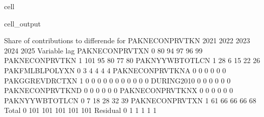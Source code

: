 \documentclass[letterpaper,10pt,english]{jupyterBook}
\begin{document}
\begin{sphinxuseclass}{cell}
\begin{sphinxVerbatimOutput}
\begin{sphinxuseclass}{cell_output}
\begin{sphinxVerbatim}[commandchars=\\\{\}]
 Share of contributions to differende for  PAKNECONPRVTKN
                            2021        2022        2023        2024        2025
Variable         lag                                                            
PAKNECONPRVTXN    0          80\PYGZpc{}         94\PYGZpc{}         97\PYGZpc{}         96\PYGZpc{}         99\PYGZpc{}
PAKNECONPRVTKN   \PYGZhy{}1         101\PYGZpc{}         95\PYGZpc{}         80\PYGZpc{}         77\PYGZpc{}         80\PYGZpc{}
PAKNYYWBTOTLCN   \PYGZhy{}1         \PYGZhy{}28\PYGZpc{}         \PYGZhy{}6\PYGZpc{}         15\PYGZpc{}         22\PYGZpc{}         26\PYGZpc{}
PAKFMLBLPOLYXN    0           3\PYGZpc{}          4\PYGZpc{}          4\PYGZpc{}          4\PYGZpc{}          4\PYGZpc{}
PAKNECONPRVTKN\PYGZus{}A  0          \PYGZhy{}0\PYGZpc{}         \PYGZhy{}0\PYGZpc{}         \PYGZhy{}0\PYGZpc{}         \PYGZhy{}0\PYGZpc{}         \PYGZhy{}0\PYGZpc{}
PAKGGREVDRCTXN   \PYGZhy{}1          \PYGZhy{}0\PYGZpc{}         \PYGZhy{}0\PYGZpc{}         \PYGZhy{}0\PYGZpc{}         \PYGZhy{}0\PYGZpc{}         \PYGZhy{}0\PYGZpc{}
                  0          \PYGZhy{}0\PYGZpc{}         \PYGZhy{}0\PYGZpc{}         \PYGZhy{}0\PYGZpc{}         \PYGZhy{}0\PYGZpc{}         \PYGZhy{}0\PYGZpc{}
DURING\PYGZus{}2010       0          \PYGZhy{}0\PYGZpc{}         \PYGZhy{}0\PYGZpc{}         \PYGZhy{}0\PYGZpc{}         \PYGZhy{}0\PYGZpc{}         \PYGZhy{}0\PYGZpc{}
PAKNECONPRVTKN\PYGZus{}D  0          \PYGZhy{}0\PYGZpc{}         \PYGZhy{}0\PYGZpc{}         \PYGZhy{}0\PYGZpc{}         \PYGZhy{}0\PYGZpc{}         \PYGZhy{}0\PYGZpc{}
PAKNECONPRVTKN\PYGZus{}X  0          \PYGZhy{}0\PYGZpc{}         \PYGZhy{}0\PYGZpc{}         \PYGZhy{}0\PYGZpc{}         \PYGZhy{}0\PYGZpc{}         \PYGZhy{}0\PYGZpc{}
PAKNYYWBTOTLCN    0           7\PYGZpc{}        \PYGZhy{}18\PYGZpc{}        \PYGZhy{}28\PYGZpc{}        \PYGZhy{}32\PYGZpc{}        \PYGZhy{}39\PYGZpc{}
PAKNECONPRVTXN   \PYGZhy{}1         \PYGZhy{}61\PYGZpc{}        \PYGZhy{}66\PYGZpc{}        \PYGZhy{}66\PYGZpc{}        \PYGZhy{}66\PYGZpc{}        \PYGZhy{}68\PYGZpc{}
Total             0         101\PYGZpc{}        101\PYGZpc{}        101\PYGZpc{}        101\PYGZpc{}        101\PYGZpc{}
Residual          0           1\PYGZpc{}          1\PYGZpc{}          1\PYGZpc{}          1\PYGZpc{}          1\PYGZpc{}


\end{sphinxVerbatim}
\end{sphinxuseclass}
\end{sphinxVerbatimOutput}
\end{sphinxuseclass}
\end{document}
